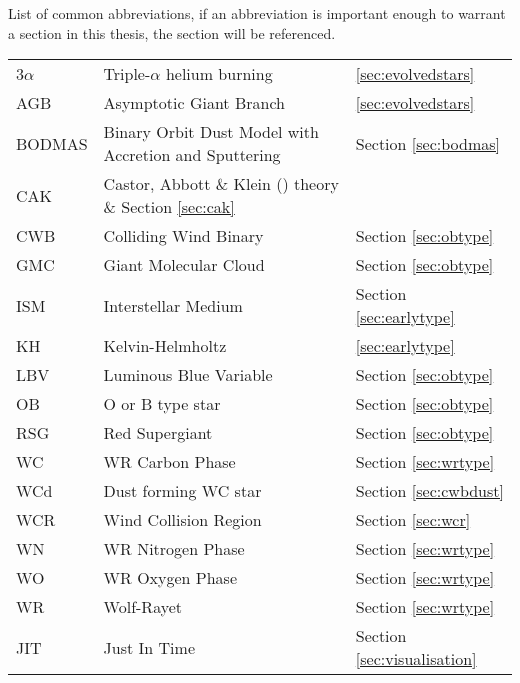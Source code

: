 \begin{abbreviations}
List of common abbreviations, if an abbreviation is important enough to warrant a section in this thesis, the section will be referenced.

\begin{table}[h]
  \centering
  \begin{tabular}{l|l|l}
    
    \hline

    3$\alpha$ & Triple-$\alpha$ helium burning & \ref{sec:evolvedstars} \\
    AGB & Asymptotic Giant Branch & \ref{sec:evolvedstars} \\
    BODMAS & Binary Orbit Dust Model with Accretion and Sputtering & Section \ref{sec:bodmas} \\
    CAK & Castor, Abbott \& Klein (\citeyear{castor_radiation-driven_1975}) theory \& Section \ref{sec:cak} \\
    CWB & Colliding Wind Binary  & Section \ref{sec:obtype} \\
    GMC & Giant Molecular Cloud & Section \ref{sec:obtype}\\
    ISM & Interstellar Medium & Section \ref{sec:earlytype} \\
    KH  & Kelvin-Helmholtz & \ref{sec:earlytype} \\ 
    LBV & Luminous Blue Variable & Section \ref{sec:obtype} \\
    OB  & O or B type star & Section \ref{sec:obtype} \\ 
    RSG & Red Supergiant & Section \ref{sec:obtype} \\
    WC  & WR Carbon Phase & Section \ref{sec:wrtype} \\
    WCd & Dust forming WC star & Section \ref{sec:cwbdust} \\
    WCR & Wind Collision Region & Section \ref{sec:wcr} \\
    WN  & WR Nitrogen Phase & Section \ref{sec:wrtype} \\
    WO  & WR Oxygen Phase & Section \ref{sec:wrtype} \\
    WR  & Wolf-Rayet & Section \ref{sec:wrtype} \\

    \hline

    JIT & Just In Time & Section \ref{sec:visualisation} \\

  \end{tabular} 
  \label{tbl:Abbreviations}
\end{table}



\end{abbreviations}
